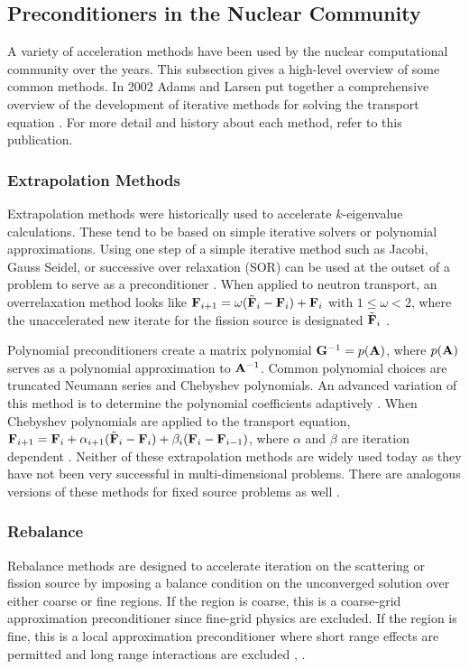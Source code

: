 \subsection{Preconditioners in the Nuclear Community}
A variety of acceleration methods have been used by the nuclear computational community over the years. This subsection gives a high-level overview of some common methods. In 2002 Adams and Larsen put together a comprehensive overview of the development of iterative methods for solving the \Sn transport equation \cite{Adams2002}. For more detail and history about each method, refer to this publication. 

\subsubsection{Extrapolation Methods}
Extrapolation methods were historically used to accelerate $k$-eigenvalue calculations. These tend to be based on simple iterative solvers or polynomial approximations. Using one step of a simple iterative method such as Jacobi, Gauss Seidel, or successive over relaxation (SOR) can be used at the outset of a problem to serve as a preconditioner \cite{Trefethen1997}. When applied to neutron transport, an overrelaxation method looks like $\mathbf{F}_{i+1} = \omega(\tilde{\mathbf{F}}_i - \mathbf{F}_i) + \mathbf{F}_i$ with $1 \le \omega < 2$, where the unaccelerated new iterate for the fission source is designated $\tilde{\mathbf{F}}_i$ \cite{Lewis1993}.

Polynomial preconditioners create a matrix polynomial $\mathbf{G}^{-1} = p(\mathbf{A})$, where $p(\mathbf{A})$ serves as a polynomial approximation to $\mathbf{A}^{-1}$. Common polynomial choices are truncated Neumann series and Chebyshev polynomials. An advanced variation of this method is to determine the polynomial coefficients adaptively \cite{Trefethen1997}. When Chebyshev polynomials are applied to the transport equation, $\mathbf{F}_{i+1} = \mathbf{F}_i + \alpha_{i+1}(\tilde{\mathbf{F}}_i - \mathbf{F}_i) + \beta_i(\mathbf{F}_i - \mathbf{F}_{i-1})$, where $\alpha$ and $\beta$ are iteration dependent \cite{Lewis1993}. Neither of these extrapolation methods are widely used today as they have not been very successful in multi-dimensional problems. There are analogous versions of these methods for fixed source problems as well \cite{Alcouffe1977}.  

\subsubsection{Rebalance}
Rebalance methods are designed to accelerate iteration on the scattering or fission source by imposing a balance condition on the unconverged solution over either coarse or fine regions. If the region is coarse, this is a coarse-grid approximation preconditioner since fine-grid physics are excluded. If the region is fine, this is a local approximation preconditioner where short range effects are permitted and long range interactions are excluded \cite{Trefethen1997}, \cite{Adams2002}.

